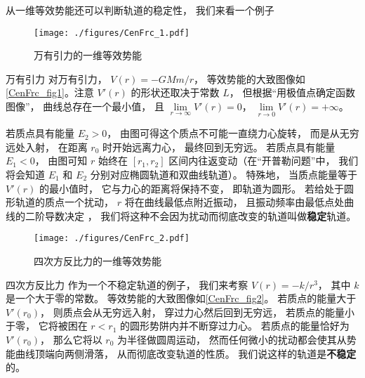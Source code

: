 从一维等效势能还可以判断轨道的稳定性， 我们来看一个例子

\begin{figure}[ht]
\centering
\texttt{[image: ./figures/CenFrc\_1.pdf]}
\caption{万有引力的一维等效势能} \label{CenFrc_fig1}
\end{figure}

\begin{example}{万有引力}
对万有引力， $V(r) = -GMm/r$， 等效势能的大致图像如\autoref{CenFrc_fig1}。注意 $V'(r)$ 的形状还取决于常数 $L$， 但根据“用极值点确定函数图像”， 曲线总存在一个最小值， 且 $\lim\limits_{r\to\infty}V'(r) = 0$， $\lim\limits_{r\to 0} V'(r) = +\infty$。

若质点具有能量 $E_2 > 0$， 由图可得这个质点不可能一直绕力心旋转， 而是从无穷远处入射， 在距离 $r_0$ 时开始远离力心， 最终回到无穷远。 若质点具有能量 $E_1 < 0$， 由图可知 $r$ 始终在 $[r_1, r_2]$ 区间内往返变动（在“开普勒问题”中， 我们将会知道 $E_1$ 和 $E_2$ 分别对应椭圆轨道和双曲线轨道）。 特殊地， 当质点能量等于 $V'(r)$ 的最小值时， 它与力心的距离将保持不变， 即轨道为圆形。 若给处于圆形轨道的质点一个扰动， $r$ 将在曲线最低点附近振动， 且振动频率由最低点处曲线的二阶导数决定%
， 我们将这种不会因为扰动而彻底改变的轨道叫做\textbf{稳定}轨道。
\end{example}

\begin{figure}[ht]
\centering
\texttt{[image: ./figures/CenFrc\_2.pdf]}
\caption{四次方反比力的一维等效势能} \label{CenFrc_fig2}
\end{figure}

\begin{example}{四次方反比力}
作为一个不稳定轨道的例子， 我们来考察 $V(r) = -k/r^3$， 其中 $k$ 是一个大于零的常数。 等效势能的大致图像如\autoref{CenFrc_fig2}。 若质点的能量大于 $V'(r_0)$， 则质点会从无穷远入射， 穿过力心然后回到无穷远， 若质点的能量小于零， 它将被困在 $r < r_1$ 的圆形势阱内并不断穿过力心。 若质点的能量恰好为 $V'(r_0)$， 那么它将以 $r_0$ 为半径做圆周运动， 然而任何微小的扰动都会使其从势能曲线顶端向两侧滑落， 从而彻底改变轨道的性质。 我们说这样的轨道是\textbf{不稳定}的。
\end{example}
